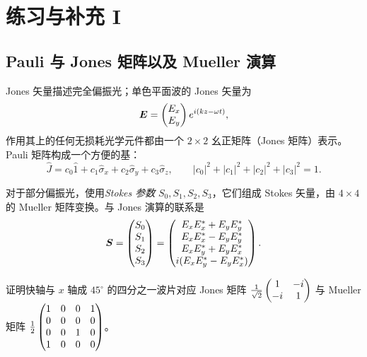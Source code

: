 \chapter{练习与补充 I}

\section{Pauli 与 Jones 矩阵以及 Mueller 演算}

Jones 矢量描述完全偏振光；单色平面波的 Jones 矢量为
\begin{equation}
\bm{E} = \begin{pmatrix} E_x \\ E_y \end{pmatrix} e^{i(kz-\omega t)},
\label{eq:5.1.1}
\end{equation}
作用其上的任何无损耗光学元件都由一个 $2\times2$ 幺正矩阵（Jones 矩阵）表示。Pauli 矩阵构成一个方便的基：
\begin{equation}
\hat J = c_0\hat 1 + c_1\hat\sigma_x + c_2\hat\sigma_y + c_3\hat\sigma_z,
\qquad |c_0|^2+|c_1|^2+|c_2|^2+|c_3|^2 = 1.
\label{eq:5.1.2}
\end{equation}

对于部分偏振光，使用\emph{Stokes 参数} $S_0,S_1,S_2,S_3$，它们组成 Stokes 矢量，由 $4\times4$ 的 Mueller 矩阵变换。与 Jones 演算的联系是
\begin{equation}
\bm{S} = \begin{pmatrix} S_0\\S_1\\S_2\\S_3 \end{pmatrix}
= \begin{pmatrix}
E_xE_x^*+E_yE_y^*\\
E_xE_x^*-E_yE_y^*\\
E_xE_y^*+E_yE_x^*\\
i(E_xE_y^*-E_yE_x^*)
\end{pmatrix}.
\label{eq:5.1.3}
\end{equation}

\begin{exercise}
证明快轴与 $x$ 轴成 $45^\circ$ 的四分之一波片对应 Jones 矩阵
$\frac{1}{\sqrt2}\begin{pmatrix}1&-i\\-i&1\end{pmatrix}$
与 Mueller 矩阵
$\frac12\begin{pmatrix}1&0&0&1\\0&0&0&0\\0&0&1&0\\1&0&0&0\end{pmatrix}$。
\end{exercise}

